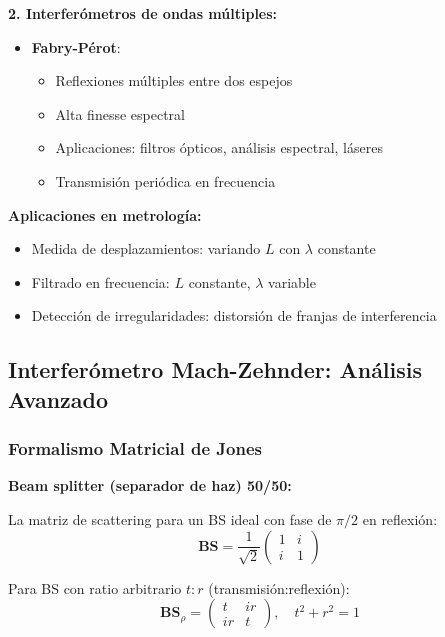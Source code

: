 \documentclass[11pt,a4paper]{article}
\begin{document}
\textbf{2. Interferómetros de ondas múltiples:}
\begin{itemize}
    \item \textbf{Fabry-Pérot}:
    \begin{itemize}
        \item Reflexiones múltiples entre dos espejos
        \item Alta finesse espectral
        \item Aplicaciones: filtros ópticos, análisis espectral, láseres
        \item Transmisión periódica en frecuencia
    \end{itemize}
\end{itemize}

\begin{nota}
\textbf{Aplicaciones en metrología:}
\begin{itemize}
    \item Medida de desplazamientos: variando $L$ con $\lambda$ constante
    \item Filtrado en frecuencia: $L$ constante, $\lambda$ variable
    \item Detección de irregularidades: distorsión de franjas de interferencia
\end{itemize}
\end{nota}

\subsection{Interferómetro Mach-Zehnder: Análisis Avanzado}

\subsubsection{Formalismo Matricial de Jones}

\textbf{Beam splitter (separador de haz) 50/50:}

La matriz de scattering para un BS ideal con fase de $\pi/2$ en reflexión:
\begin{equation}
    \mathbf{BS} = \frac{1}{\sqrt{2}}\begin{pmatrix} 1 & i \\ i & 1 \end{pmatrix}
\end{equation}

Para BS con ratio arbitrario $t:r$ (transmisión:reflexión):
\begin{equation}
    \mathbf{BS}_\rho = \begin{pmatrix} t & ir \\ ir & t \end{pmatrix}, \quad t^2 + r^2 = 1
\end{equation}
\end{document}
